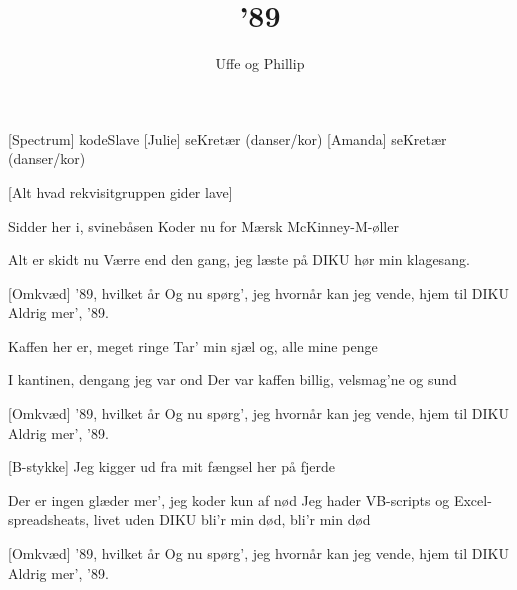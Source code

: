\documentclass[a4paper,11pt]{article}
\title{'89}
\author{Uffe og Phillip}
\begin{document}
\maketitle

\begin{roles}  
  [Spectrum] kodeSlave
  [Julie] seKret\ae r (danser/kor)
  [Amanda] seKret\ae r (danser/kor)
\end{roles}

\begin{props}
  [Alt hvad rekvisitgruppen gider lave]
\end{props}

\begin{song}

Sidder her i, svineb\aa{}sen
Koder nu for
M\ae{}rsk McKinney-M-\o{}ller

Alt er skidt nu
V\ae{}rre end den gang,
jeg l\ae{}ste p\aa{} DIKU
h\o{}r min klagesang.


[Omkv\ae{}d]
'89, hvilket \aa{}r
Og nu sp\o{}rg', jeg hvorn\aa{}r
kan jeg vende, hjem til DIKU
Aldrig mer', '89.

Kaffen her er, meget ringe
Tar' min sj\ae{}l og, alle mine penge

I kantinen, dengang jeg var ond
Der var kaffen billig, velsmag'ne og sund

[Omkv\ae{}d]
'89, hvilket \aa{}r
Og nu sp\o{}rg', jeg hvorn\aa{}r
kan jeg vende, hjem til DIKU
Aldrig mer', '89.

[B-stykke]
Jeg kigger ud
fra mit f\ae{}ngsel her p\aa{} fjerde

Der er ingen gl\ae{}der mer', jeg koder kun af n\o{}d
Jeg hader VB-scripts og Excel-spreadsheats,
livet uden DIKU bli'r min d\o{}d, bli'r min d\o{}d

[Omkv\ae{}d]
'89, hvilket \aa{}r
Og nu sp\o{}rg', jeg hvorn\aa{}r
kan jeg vende, hjem til DIKU
Aldrig mer', '89.


\end{song}
\end{document}
